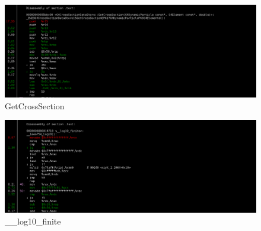 \documentclass[a4paper]{jpconf}
\begin{document}
\begin{appendices}
\begin{figure}[H]
\begin{center}
\includegraphics[scale=0.33]{images/GetCrossSection_P8.png}
\caption{GetCrossSection}
\end{center}
\end{figure}

\begin{figure}[H]
\begin{center}
\includegraphics[scale=0.33]{images/__log10_finite_P8.png}
\caption{\_\_log10\_finite}
\end{center}
\end{figure}


\end{appendices}
%
%
\end{document}
